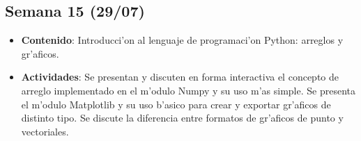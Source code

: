\documentclass[letterpaper,11pt]{exam}
\begin{document}
\begin{multicols}{2}
\begin{scriptsize}
\subsection*{Semana 15 (29/07)}
\begin{itemize}
\item \textbf{Contenido}: Introducci'on al lenguaje de programaci'on Python: arreglos y gr'aficos. 
\item \textbf{Actividades}: Se presentan y discuten en forma interactiva el concepto de arreglo implementado en el m'odulo Numpy y su uso m'as simple. Se presenta el m'odulo Matplotlib y su uso b'asico para crear y exportar gr'aficos de distinto tipo. Se discute la diferencia entre formatos de gr'aficos de punto y vectoriales.
\end{itemize}
\end{scriptsize}
\end{multicols}
\end{document}

